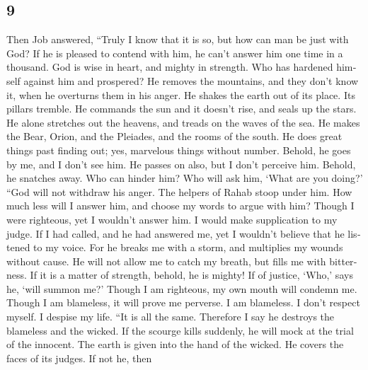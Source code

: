 \begin{paracol}{2}
\switchcolumn
\begin{otherlanguage}{english}

\hypertarget{section-17}{%
\section{9}\label{section-17}}

 Then Job answered,  ``Truly I know that it
is so, but how can man be just with God?  If he is pleased
to contend with him, he can't answer him one time in a thousand.
 God is wise in heart, and mighty in strength. Who has
hardened himself against him and prospered?  He removes
the mountains, and they don't know it, when he overturns them in his
anger.  He shakes the earth out of its place. Its pillars
tremble.  He commands the sun and it doesn't rise, and
seals up the stars.  He alone stretches out the heavens,
and treads on the waves of the sea.  He makes the Bear,
Orion, and the Pleiades, and the rooms of the south.  He
does great things past finding out; yes, marvelous things without
number.  Behold, he goes by me, and I don't see him. He
passes on also, but I don't perceive him.  Behold, he
snatches away. Who can hinder him? Who will ask him, `What are you
doing?'  ``God will not withdraw his anger. The helpers
of Rahab stoop under him.  How much less will I answer
him, and choose my words to argue with him?  Though I
were righteous, yet I wouldn't answer him. I would make supplication to
my judge.  If I had called, and he had answered me, yet I
wouldn't believe that he listened to my voice.  For he
breaks me with a storm, and multiplies my wounds without cause.
 He will not allow me to catch my breath, but fills me
with bitterness.  If it is a matter of strength, behold,
he is mighty! If of justice, `Who,' says he, `will summon me?'
 Though I am righteous, my own mouth will condemn me.
Though I am blameless, it will prove me perverse.  I am
blameless. I don't respect myself. I despise my life. 
``It is all the same. Therefore I say he destroys the blameless and the
wicked.  If the scourge kills suddenly, he will mock at
the trial of the innocent.  The earth is given into the
hand of the wicked. He covers the faces of its judges. If not he, then

\end{otherlanguage}
\end{paracol}
